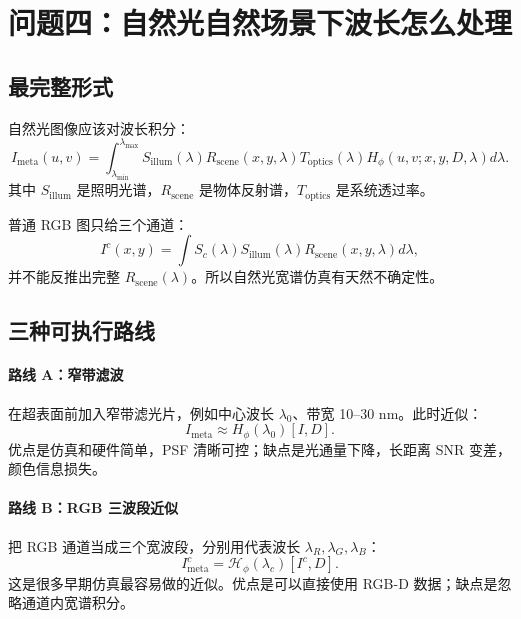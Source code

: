\documentclass[11pt,a4paper,fontset=none]{ctexart}
\begin{document}
\section{问题四：自然光自然场景下波长怎么处理}

\subsection{最完整形式}

自然光图像应该对波长积分：
\begin{equation}
  I_{\mathrm{meta}}(u,v)
  =
  \int_{\lambda_{\min}}^{\lambda_{\max}}
  S_{\mathrm{illum}}(\lambda)
  R_{\mathrm{scene}}(x,y,\lambda)
  T_{\mathrm{optics}}(\lambda)
  H_\phi(u,v;x,y,D,\lambda)
  d\lambda.
\end{equation}
其中 $S_{\mathrm{illum}}$ 是照明光谱，$R_{\mathrm{scene}}$ 是物体反射谱，$T_{\mathrm{optics}}$ 是系统透过率。

普通 RGB 图只给三个通道：
\begin{equation}
  I^c(x,y)=
  \int S_c(\lambda)
  S_{\mathrm{illum}}(\lambda)
  R_{\mathrm{scene}}(x,y,\lambda)
  d\lambda,
\end{equation}
并不能反推出完整 $R_{\mathrm{scene}}(\lambda)$。所以自然光宽谱仿真有天然不确定性。

\subsection{三种可执行路线}

\paragraph{路线 A：窄带滤波}
在超表面前加入窄带滤光片，例如中心波长 $\lambda_0$、带宽 10--30 nm。此时近似：
\begin{equation}
  I_{\mathrm{meta}}\approx H_\phi(\lambda_0)[I,D].
\end{equation}
优点是仿真和硬件简单，PSF 清晰可控；缺点是光通量下降，长距离 SNR 变差，颜色信息损失。

\paragraph{路线 B：RGB 三波段近似}
把 RGB 通道当成三个宽波段，分别用代表波长 $\lambda_R,\lambda_G,\lambda_B$：
\begin{equation}
  I_{\mathrm{meta}}^c
  =
  \mathcal H_\phi(\lambda_c)[I^c,D].
\end{equation}
这是很多早期仿真最容易做的近似。优点是可以直接使用 RGB-D 数据；缺点是忽略通道内宽谱积分。
\end{document}
